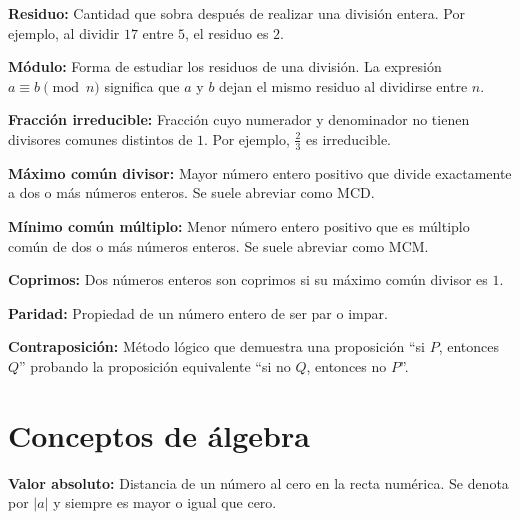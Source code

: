 \documentclass[12pt,final]{report}
\theoremstyle{plain}
\theoremstyle{definition}
\begin{document}
\textbf{Residuo:} Cantidad que sobra después de realizar una división entera. Por ejemplo, al dividir $17$ entre $5$, el residuo es $2$.

\vspace{0.5em}

\textbf{Módulo:} Forma de estudiar los residuos de una división. La expresión $a \equiv b \pmod{n}$ significa que $a$ y $b$ dejan el mismo residuo al dividirse entre $n$.

\vspace{0.5em}

\textbf{Fracción irreducible:} Fracción cuyo numerador y denominador no tienen divisores comunes distintos de $1$. Por ejemplo, $\frac{2}{3}$ es irreducible.

\vspace{0.5em}

\textbf{Máximo común divisor:} Mayor número entero positivo que divide exactamente a dos o más números enteros. Se suele abreviar como MCD.

\vspace{0.5em}

\textbf{Mínimo común múltiplo:} Menor número entero positivo que es múltiplo común de dos o más números enteros. Se suele abreviar como MCM.

\vspace{0.5em}

\textbf{Coprimos:} Dos números enteros son coprimos si su máximo común divisor es $1$.

\vspace{0.5em}

\textbf{Paridad:} Propiedad de un número entero de ser par o impar.

\vspace{0.5em}

\textbf{Contraposición:} Método lógico que demuestra una proposición ``si $P$, entonces $Q$'' probando la proposición equivalente ``si no $Q$, entonces no $P$''.

\section*{Conceptos de álgebra}

\vspace{0.5em}

\textbf{Valor absoluto:} Distancia de un número al cero en la recta numérica. Se denota por $|a|$ y siempre es mayor o igual que cero.

\vspace{0.5em}
\end{document}

